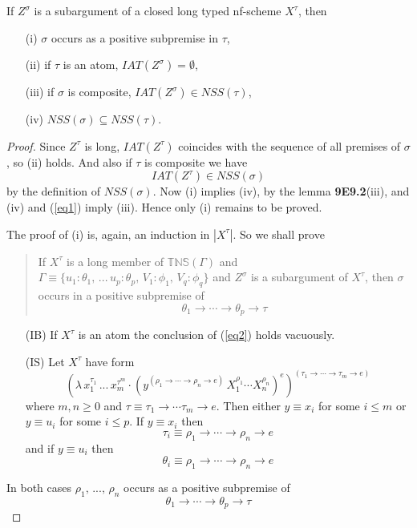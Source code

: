 \documentclass[a4paper,10pt]{article}
\begin{document}
\begin{lem}\label{8E7} If $Z^{\sigma}$ is a subargument of a closed long typed nf-scheme $X^{\tau}$, then
\begin{itemize}
 \item[(i)] $\sigma$ occurs as a positive subpremise in $\tau$,
 \item[(ii)] if $\tau$ is an atom, $IAT(Z^{\sigma}) = \emptyset$,
 \item[(iii)] if $\sigma$ is composite, $IAT(Z^{\sigma}) \in NSS(\tau)$,
 \item[(iv)] $NSS(\sigma) \subseteq NSS(\tau)$.
\end{itemize}
\begin{proof}
 Since $Z^{\tau}$ is long, $IAT(Z^{\tau})$ coincides with the sequence of all premises of $\sigma$, so (ii) holds. And also if $\tau$ is composite we have
 \begin{equation}\label{eq1}
  IAT(Z^{\tau}) \in NSS(\sigma)
 \end{equation}
by the definition of $NSS(\sigma)$. Now (i) implies (iv), by the lemma \textbf{9E9.2}(iii), and (iv) and (\ref{eq1}) imply (iii). Hence only (i) remains to 
be proved. 

The proof of (i) is, again, an induction in $|X^{\tau}|$. So we shall prove
\begin{quotation}
  \noindent If  $X^{\tau}$  is a long member of $\mathbb{TNS}(\Gamma)$ and  $\Gamma \equiv \{u_1:\theta_1,\, ...\, u_p:\theta_p,\,V_1:\phi_1,\,V_q:\phi_q\}$ 
  and  $Z^{\sigma}$ is a subargument of  $X^{\tau}$, then $\sigma$  occurs in a positive subpremise of 
  \begin{equation}\label{eq2}
   \theta_1\to \cdots \to \theta_p \to \tau
  \end{equation}
\end{quotation}
\begin{itemize}
 \item[(IB)] If $X^{\tau}$ is an atom the conclusion of (\ref{eq2}) holds vacuously.
 \item[(IS)] Let $X^{\tau}$ have form
 \begin{equation}
  (\lambda\,x_1^{\tau_1}\, ...\,x_m^{\tau^m}\cdot (y^{(\rho_1\to\cdots \to \rho_n\to e)}\,X_1^{\rho_1}\cdots X_n^{\rho_n})^e)^{(\tau_1\to\cdots \to\tau_m\to e)}
 \end{equation}
where $m, n \geq 0$ and $\tau \equiv \tau_1\to\cdots \tau_m\to e$. Then either $y \equiv x_i$ for some $i \leq m$ or $y \equiv u_i$ for some $i \leq p$. If $y\equiv x_i$ then
\begin{equation}
 \tau_i \equiv \rho_1\to\cdots \to \rho_n\to e
\end{equation}
and if $y \equiv u_i$ then 
\begin{equation}
 \theta_i \equiv \rho_1\to\cdots \to \rho_n\to e
\end{equation}
\end{itemize}
In both cases $\rho_1,\,...,\,\rho_n$ occurs as a positive subpremise of
\begin{equation}\label{eq3}
 \theta_1\to\cdots\to\theta_p\to\tau
\end{equation}


\end{proof}
\end{lem}
\end{document}
